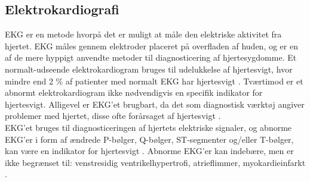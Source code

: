 \subsection{Elektrokardiografi}
EKG er en metode hvorpå det er muligt at måle den elektriske aktivitet fra hjertet. EKG måles gennem elektroder placeret på overfladen af huden, og er en af de mere hyppigt anvendte metoder til diagnosticering af hjertesygdomme. Et normalt-udseende elektrokardiogram bruges til udelukkelse af hjertesvigt, hvor mindre end 2 \% af patienter med normalt EKG har hjertesvigt \citep{authors2012esc}. Tværtimod er et abnormt elektrokardiogram ikke nødvendigvis en specifik indikator for hjertesvigt. Alligevel er EKG’et brugbart, da det som diagnostisk værktøj angiver problemer med hjertet, disse ofte forårsaget af hjertesvigt \citep{davie1996value} \citep{authors2012esc} \citep{madias2011recording}.\\
EKG’et bruges til diagnosticeringen af hjertets elektriske signaler, og abnorme EKG’er i form af ændrede P-bølger, Q-bølger, ST-segmenter og/eller T-bølger, kan være en indikator for hjertesvigt \citep{madias2011recording}. Abnorme EKG’er kan indebære, men er ikke begrænset til: venstresidig ventrikelhypertrofi, atrieflimmer, myokardieinfarkt \citep{davie1996value}.

